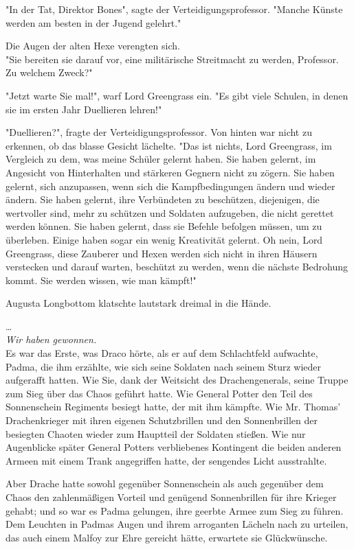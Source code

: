 {"In der Tat, Direktor Bones", sagte der Verteidigungsprofessor. "Manche Künste werden am besten in der Jugend gelehrt."

Die Augen der alten Hexe verengten sich.\\ "Sie bereiten sie darauf vor, eine militärische Streitmacht zu werden, Professor. Zu welchem Zweck?"

"Jetzt warte Sie mal!", warf Lord Greengrass ein. "Es gibt viele Schulen, in denen sie im ersten Jahr Duellieren lehren!"

"Duellieren?", fragte der Verteidigungsprofessor. Von hinten war nicht zu erkennen, ob das blasse Gesicht lächelte. "Das ist nichts, Lord Greengrass, im Vergleich zu dem, was meine Schüler gelernt haben. Sie haben gelernt, im Angesicht von Hinterhalten und stärkeren Gegnern nicht zu zögern. Sie haben gelernt, sich anzupassen, wenn sich die Kampfbedingungen ändern und wieder ändern. Sie haben gelernt, ihre Verbündeten zu beschützen, diejenigen, die wertvoller sind, mehr zu schützen und Soldaten aufzugeben, die nicht gerettet werden können. Sie haben gelernt, dass sie Befehle befolgen müssen, um zu überleben. Einige haben sogar ein wenig Kreativität gelernt. Oh nein, Lord Greengrass, diese Zauberer und Hexen werden sich nicht in ihren Häusern verstecken und darauf warten, beschützt zu werden, wenn die nächste Bedrohung kommt. Sie werden wissen, wie man kämpft!"

Augusta Longbottom klatschte lautstark dreimal in die Hände.

…\\ \emph{Wir haben gewonnen.}\\ Es war das Erste, was Draco hörte, als er auf dem Schlachtfeld aufwachte, Padma, die ihm erzählte, wie sich seine Soldaten nach seinem Sturz wieder aufgerafft hatten. Wie Sie, dank der Weitsicht des Drachengenerals, seine Truppe zum Sieg über das Chaos geführt hatte. Wie General Potter den Teil des Sonnenschein Regiments besiegt hatte, der mit ihm kämpfte. Wie Mr. Thomas' Drachenkrieger mit ihren eigenen Schutzbrillen und den Sonnenbrillen der besiegten Chaoten wieder zum Hauptteil der Soldaten stießen. Wie nur Augenblicke später General Potters verbliebenes Kontingent die beiden anderen Armeen mit einem Trank angegriffen hatte, der sengendes Licht ausstrahlte.

Aber Drache hatte sowohl gegenüber Sonnenschein als auch gegenüber dem Chaos den zahlenmäßigen Vorteil und genügend Sonnenbrillen für ihre Krieger gehabt; und so war es Padma gelungen, ihre geerbte Armee zum Sieg zu führen.\\ Dem Leuchten in Padmas Augen und ihrem arroganten Lächeln nach zu urteilen, das auch einem Malfoy zur Ehre gereicht hätte, erwartete sie Glückwünsche.

}

